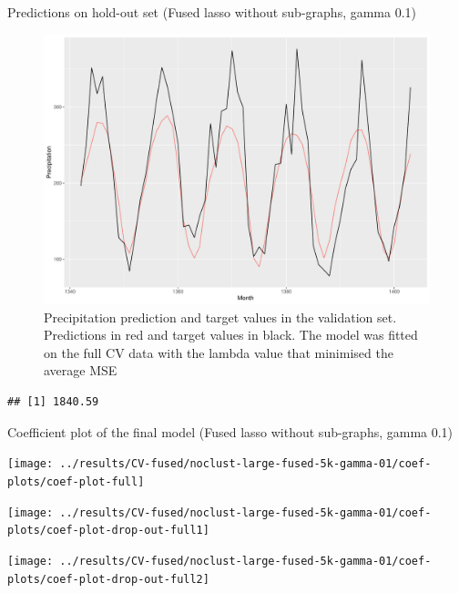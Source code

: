 \documentclass[
  ignorenonframetext,
]{beamer}
\begin{document}
\begin{frame}[fragile]{Predictions on hold-out set (Fused lasso without
sub-graphs, gamma 0.1)}
\protect\hypertarget{predictions-on-hold-out-set-fused-lasso-without-sub-graphs-gamma-0.1}{}
\begin{figure}

{\centering \includegraphics[width=0.75\linewidth]{ma-presentation_files/figure-beamer/pred-plot-full-fused-noclust-01-1} 

}

\caption{Precipitation prediction and target values in the validation set. Predictions in red and target values in black. The model was fitted on the full CV data with the lambda value that minimised the average MSE}\label{fig:pred-plot-full-fused-noclust-01}
\end{figure}

\begin{verbatim}
## [1] 1840.59
\end{verbatim}
\end{frame}

\begin{frame}{Coefficient plot of the final model (Fused lasso without
sub-graphs, gamma 0.1)}
\protect\hypertarget{coefficient-plot-of-the-final-model-fused-lasso-without-sub-graphs-gamma-0.1}{}
\begin{center}\texttt{[image: ../results/CV-fused/noclust-large-fused-5k-gamma-01/coef-plots/coef-plot-full]} \end{center}

\begin{center}\texttt{[image: ../results/CV-fused/noclust-large-fused-5k-gamma-01/coef-plots/coef-plot-drop-out-full1]} \end{center}

\begin{center}\texttt{[image: ../results/CV-fused/noclust-large-fused-5k-gamma-01/coef-plots/coef-plot-drop-out-full2]} \end{center}
\end{frame}
\end{document}
